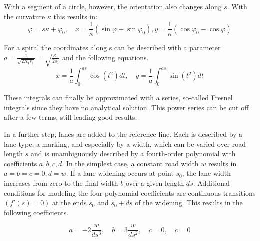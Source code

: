 \documentclass[a4paper, 10pt, conference]{ieeeconf}      %
\begin{document}
    With a segment of a circle, however, the orientation also changes along \(s\). With the curvature \(\kappa\) this results in:
    \begin{equation}
        \varphi = s  \kappa + \varphi_0, \quad x = \frac{1}{\kappa} \left(\sin\varphi - \sin\varphi_0 \right),  y = \frac{1}{\kappa} \left(\cos\varphi_0 - \cos\varphi \right) 
    \end{equation} 

    For a spiral the coordinates along s can be described with a parameter \(a = \frac{1}{\sqrt{2R_1s_1}} = \sqrt{\frac{\kappa_1}{2s_1}}\) and the following equations. 
    \begin{equation} 
        x = \frac{1}{a}\int_0^{as}  \cos\left(t^2\right)dt, \quad y = \frac{1}{a}\int_0^{as}  \sin\left(t^2\right)dt 
    \end{equation}

    These integrals can finally be approximated with a series, so-called Fresnel integrals since they have no analytical solution. This power series can be cut off after a few terms, still leading good results.

    In a further step, lanes are added to the reference line. Each is described by a lane type, a marking, and especially by a width, which can be varied over road length \(s\) and is unambiguously described by a fourth-order polynomial with coefficients \(a,b,c,d\). In the simplest case, a constant road width \(w\) results in \(a=b=c=0, d=w\). If a lane widening occurs at point \(s_0\), the lane width increases from zero to the final width \(b\) over a given length \(ds\). Additional conditions for modeling the four polynomial coefficients are continuous transitions \(\left(f'(s) = 0\right)\) at the ends \(s_0\) and \(s_0 + ds\) of the widening. This results in the following coefficients.

    \begin{equation}
        a = -2\frac{w}{ds^3}, \quad b=3 \frac{w}{ds^2}, \quad c=0 , \quad c=0   
    \end{equation}
        
\end{document}
